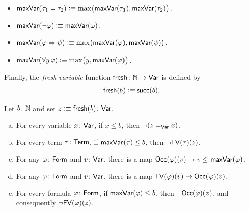 \begin{defn}
    \begin{itemize}
        \item $\mathsf{maxVar}(\tau_1\doteq\tau_2)\mathrel{\vcentcolon}\equiv\max\bigl(\mathsf{maxVar}(\tau_1),\mathsf{maxVar}(\tau_2)\bigr)$.
        \item $\mathsf{maxVar}(\neg\varphi)\mathrel{\vcentcolon}\equiv\mathsf{maxVar}(\varphi)$.
        \item $\mathsf{maxVar}(\varphi\mathrel{\Rightarrow}\psi)\mathrel{\vcentcolon}\equiv\max\bigl(\mathsf{maxVar}(\varphi),\mathsf{maxVar}(\psi)\bigr)$.
        \item $\mathsf{maxVar}(\forall y\,\varphi)\mathrel{\vcentcolon}\equiv\max\bigl(y,\mathsf{maxVar}(\varphi)\bigr)$.
    \end{itemize}
    Finally, the \textsl{fresh variable} function $\fun{fresh}\colon\N\to\fun{Var}$ is defined by
    \[
        \mathsf{fresh}(b)\mathrel{\vcentcolon}\equiv\mathsf{succ}(b).
    \]
\end{defn}

\begin{lem}\label{lem:freshness}
    Let\/ $b\colon\N$ and set\/ $z\defeq\fun{fresh}(b)\colon\fun{Var}$.
    \begin{enumerate}[a),font=\upshape]
        \item For every variable\/ $x\colon\fun{Var}$, if\/ $x\le b$, then\/ $\neg(z\mathrel{=_{\mathsf{Var}}}x)$.

        \item For every term\/ $\tau\colon\fun{Term}$, if\/ $\mathsf{maxVar}(\tau)\le b$, then\/ $\neg\mathsf{FV}(\tau)(z)$.

        \item For any $\varphi\colon\fun{Form}$ and $v\colon\fun{Var}$, there is a map $\mathsf{Occ}(\varphi)(v)\to v\le\mathsf{maxVar}(\varphi)$.

        \item For any $\varphi\colon\fun{Form}$ and $v\colon\fun{Var}$, there is a map $\mathsf{FV}(\varphi)(v)\to\mathsf{Occ}(\varphi)(v)$. 

        \item For every formula\/ $\varphi\colon\fun{Form}$, if\/ $\mathsf{maxVar}(\varphi)\le b$, then\/ $\neg\mathsf{Occ}(\varphi)(z)$, and consequently\/ $\neg\mathsf{FV}(\varphi)(z)$.
    \end{enumerate}
\end{lem}

